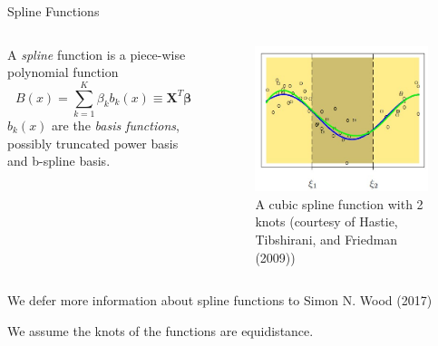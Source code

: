 \documentclass[
  ignorenonframetext,
  aspectratio=169]{beamer}
\newcommand{\bs}[1]{\boldsymbol{#1}}
\begin{document}
\begin{frame}{Spline Functions}
\protect\hypertarget{spline-functions}{}
\begin{columns}[T]
\begin{column}{0.48\textwidth}
A \emph{spline} function is a piece-wise polynomial function \[
B(x) = \sum\limits_{k = 1}^K \beta_k b_k(x) \equiv  \bs X^T \bs \beta
\] \(b_k(x)\) are the \emph{basis functions}, possibly truncated power
basis and b-spline basis.
\end{column}

\begin{column}{0.48\textwidth}
\centering

\begin{figure}
\centering
\includegraphics[width=\textwidth,height=0.6\textheight]{spline_visual.jpg}
\caption{A cubic spline function with 2 knots (courtesy of Hastie,
Tibshirani, and Friedman (2009))}
\end{figure}
\end{column}
\end{columns}

We defer more information about spline functions to Simon N. Wood (2017)

We assume the knots of the functions are equidistance.
\end{frame}
\end{document}
